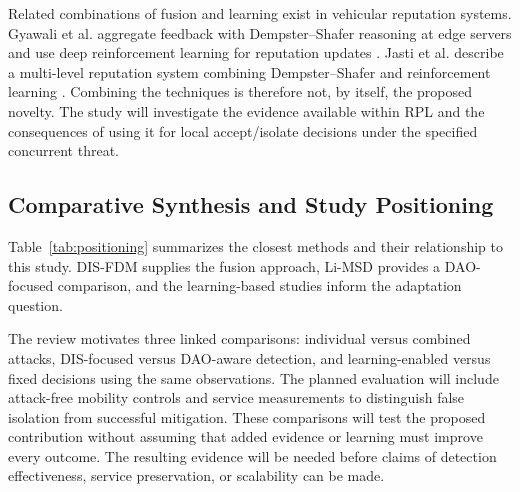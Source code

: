\documentclass[journal]{IEEEtran}
\begin{document}
Related combinations of fusion and learning exist in vehicular reputation systems. Gyawali et al. aggregate feedback with Dempster--Shafer reasoning at edge servers and use deep reinforcement learning for reputation updates \cite{gyawali2021}. Jasti et al. describe a multi-level reputation system combining Dempster--Shafer and reinforcement learning \cite{jasti2024}. Combining the techniques is therefore not, by itself, the proposed novelty. The study will investigate the evidence available within RPL and the consequences of using it for local accept/isolate decisions under the specified concurrent threat.

\subsection{Comparative Synthesis and Study Positioning}
Table~\ref{tab:positioning} summarizes the closest methods and their relationship to this study. DIS-FDM supplies the fusion approach, Li-MSD provides a DAO-focused comparison, and the learning-based studies inform the adaptation question.

The review motivates three linked comparisons: individual versus combined attacks, DIS-focused versus DAO-aware detection, and learning-enabled versus fixed decisions using the same observations. The planned evaluation will include attack-free mobility controls and service measurements to distinguish false isolation from successful mitigation. These comparisons will test the proposed contribution without assuming that added evidence or learning must improve every outcome. The resulting evidence will be needed before claims of detection effectiveness, service preservation, or scalability can be made.
\end{document}
